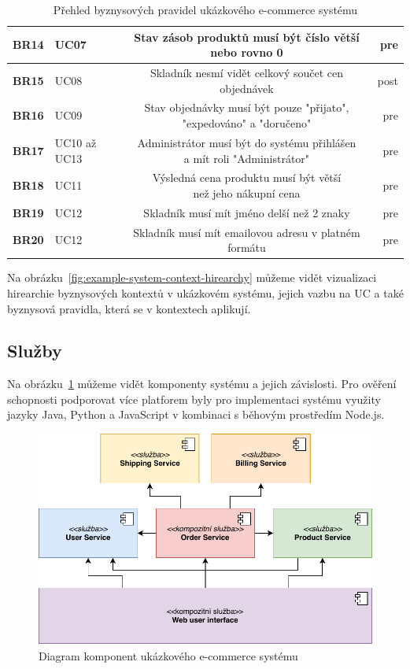 \begin{table}
\begin{tabular}{ l l c r }
        \textbf{BR14} & UC07 & Stav zásob produktů musí být číslo větší nebo rovno 0 & pre \\ \hline
        \textbf{BR15} & UC08 & Skladník nesmí vidět celkový součet cen objednávek & post \\ \hline
        \textbf{BR16} & UC09 & \makecell[c]{Stav objednávky musí být pouze "přijato", \\ "expedováno" a "doručeno"} & pre \\ \hline
        \textbf{BR17} & UC10 až UC13 & \makecell[c]{Administrátor musí být do systému přihlášen \\ a mít roli "Administrátor"} & pre \\ \hline
        \textbf{BR18} & UC11 & \makecell[c]{Výsledná cena produktu musí být větší \\ než jeho nákupní cena} & pre \\ \hline
        \textbf{BR19} & UC12 & Skladník musí mít jméno delší než 2 znaky & pre \\ \hline
        \textbf{BR20} & UC12 & Skladník musí mít emailovou adresu v platném formátu & pre \\
        \hline
    \end{tabular}
    \caption{Přehled byznysových pravidel ukázkového e-commerce systému}
    \label{tbl:business-rules}
\end{table}


Na obrázku~\ref{fig:example-system-context-hirearchy} můžeme vidět vizualizaci
hirearchie byznysových kontextů v ukázkovém systému, jejich vazbu na \gls{UC} a také byznysová
pravidla, která se v kontextech aplikují.

\subsection{Služby}

Na obrázku~\ref{fig:example-system} můžeme vidět komponenty systému a jejich závislosti.
Pro ověření schopnosti podporovat více platforem byly pro implementaci systému využity
jazyky Java, Python a JavaScript v kombinaci s běhovým prostředím Node.js.

\begin{figure}
    \centering
    \includegraphics[keepaspectratio=true, width=0.8\linewidth]{figures/example-system.pdf}
    \caption{Diagram komponent ukázkového e-commerce systému}
    \label{fig:example-system}
\end{figure}

